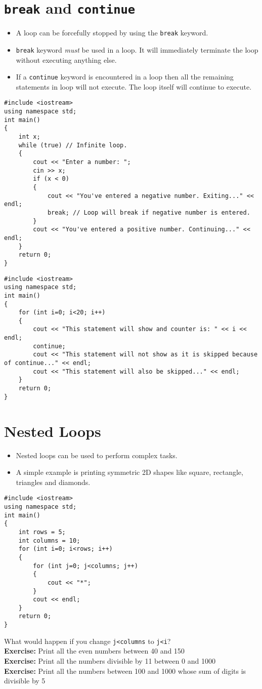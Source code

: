 \documentclass[12pt,a4paper]{article}
\begin{document}
\section{\texttt{break} and \texttt{continue}}
\begin{itemize}
\item A loop can be forcefully stopped by using the \verb|break| keyword.
\item \verb|break| keyword \emph{must} be used in a loop. It will immediately terminate the loop without executing anything else.
\item If a \verb|continue| keyword is encountered in a loop then all the remaining statements in loop will not execute. The loop itself will continue to execute.
\end{itemize}
\begin{lstlisting}[caption={Breaking a Loop}]
#include <iostream>
using namespace std;
int main()
{
	int x;
	while (true) // Infinite loop.
	{
		cout << "Enter a number: ";
		cin >> x;
		if (x < 0)
		{
			cout << "You've entered a negative number. Exiting..." << endl;
			break; // Loop will break if negative number is entered.
		}
		cout << "You've entered a positive number. Continuing..." << endl;
	}
	return 0;
}
\end{lstlisting}
\begin{lstlisting}[caption={Using continue in a Loop}]
#include <iostream>
using namespace std;
int main()
{
	for (int i=0; i<20; i++)
	{
		cout << "This statement will show and counter is: " << i << endl;
		continue;
		cout << "This statement will not show as it is skipped because of continue..." << endl;
		cout << "This statement will also be skipped..." << endl;
	}
	return 0;
}
\end{lstlisting}
\section{Nested Loops}
\begin{itemize}
\item Nested loops can be used to perform complex tasks.
\item A simple example is printing symmetric 2D shapes like square, rectangle, triangles and diamonds.
\end{itemize}
\begin{lstlisting}[caption={Using for Loop to Make Rectangle and Square}]
#include <iostream>
using namespace std;
int main()
{
	int rows = 5;
	int columns = 10;
	for (int i=0; i<rows; i++)
	{
		for (int j=0; j<columns; j++)
		{
			cout << "*";
		}
		cout << endl;			
	}
	return 0;
}
\end{lstlisting}
What would happen if you change \verb|j<columns| to \verb|j<i|?\\
\noindent \textbf{Exercise:} Print all the even numbers between 40 and 150\\
\noindent \textbf{Exercise:} Print all the numbers divisible by 11 between 0 and 1000\\
\noindent \textbf{Exercise:} Print all the numbers between 100 and 1000 whose sum of digits is divisible by 5
\end{document}
